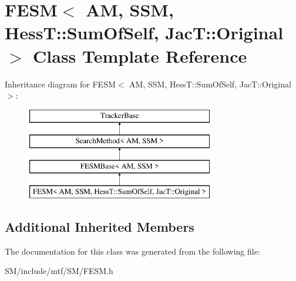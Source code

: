 \hypertarget{classFESM_3_01AM_00_01SSM_00_01HessT_1_1SumOfSelf_00_01JacT_1_1Original_01_4}{\section{F\-E\-S\-M$<$ A\-M, S\-S\-M, Hess\-T\-:\-:Sum\-Of\-Self, Jac\-T\-:\-:Original $>$ Class Template Reference}
\label{classFESM_3_01AM_00_01SSM_00_01HessT_1_1SumOfSelf_00_01JacT_1_1Original_01_4}
}
Inheritance diagram for F\-E\-S\-M$<$ A\-M, S\-S\-M, Hess\-T\-:\-:Sum\-Of\-Self, Jac\-T\-:\-:Original $>$\-:\begin{figure}[H]
\begin{center}
\leavevmode
\includegraphics[height=4.000000cm]{classFESM_3_01AM_00_01SSM_00_01HessT_1_1SumOfSelf_00_01JacT_1_1Original_01_4}
\end{center}
\end{figure}
\subsection*{Additional Inherited Members}


The documentation for this class was generated from the following file\-:\begin{DoxyCompactItemize}
\item 
S\-M/include/mtf/\-S\-M/F\-E\-S\-M.\-h\end{DoxyCompactItemize}
